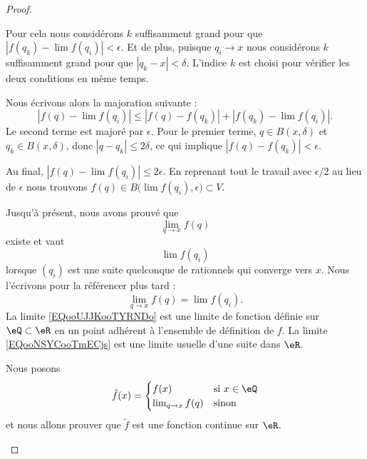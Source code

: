 \begin{proof}
\begin{subproof}
		Pour cela nous considérons \( k\) suffisamment grand pour que \( | f(q_k)-\lim f(q_i)  |<\epsilon\). Et de plus, puisque \( q_i\to x\) nous considérons \( k\) suffisamment grand pour que \( | q_k-x |<\delta\). L'indice \( k\) est choisi pour vérifier les deux conditions en même temps.

		Nous écrivons alors la majoration suivante :
		\begin{equation}
			| f(q)-\lim f(q_i) |\leq | f(q)-f(q_k) |+| f(q_k)-\lim f(q_i) |.
		\end{equation}
		Le second terme est majoré par \( \epsilon\). Pour le premier terme, \( q\in B(x,\delta)\) et \( q_k\in B(x,\delta)\), donc \( | q-q_k |\leq 2\delta\), ce qui implique \( | f(q)-f(q_k) |<\epsilon\).

		Au final, \( | f(q)-\lim f(q_i) |\leq 2\epsilon\). En reprenant tout le travail avec \( \epsilon/2\) au lieu de \( \epsilon\) nous trouvons \( f(q)\in B\big( \lim f(q_i),\epsilon \big)\subset V\).

		\spitem[Intermède]
		Jusqu'à présent, nous avons prouvé que
		\begin{equation}        \label{EQooUJJKooTYRNDo}
			\lim_{q\to x} f(q)
		\end{equation}
		existe et vaut
		\begin{equation}        \label{EQooNSYCooTmECjs}
			\lim f(q_i)
		\end{equation}
		lorsque \( (q_{i})\) est une suite quelconque de rationnels qui converge vers \( x\). Nous l'écrivons pour la référencer plus tard :
		\begin{equation}        \label{EQooSGCMooKtpVMy}
			\lim_{q\to x} f(q)=\lim f(q_i).
		\end{equation}
		La limite \eqref{EQooUJJKooTYRNDo} est une limite de fonction définie sur \( \eQ\subset \eR\) en un point adhérent à l'ensemble de définition de \( f\). La limite \eqref{EQooNSYCooTmECjs} est une limite usuelle d'une suite dans \( \eR\).

		\spitem[Le prolongement]
		Nous posons
		\begin{equation}
			\tilde f(x)=\begin{cases}
				f(x)               & \text{si } x\in \eQ \\
				\lim_{q\to x} f(q) & \text{sinon }
			\end{cases}
		\end{equation}
		et nous allons prouver que \( \tilde f\) est une fonction continue sur \( \eR\).

		\spitem[Continuité]


\end{subproof}
\end{proof}

